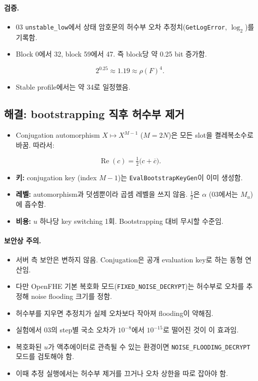 \documentclass[11pt,a4paper]{article}
\renewcommand{\Re}{\operatorname{Re}}
\begin{document}
\paragraph{검증.}
\begin{itemize}
\item 03 \texttt{unstable\_low}에서 상태 암호문의 허수부 오차 추정치(\texttt{GetLogError}, $\log_2$)를 기록함.
\item Block 0에서 32, block 59에서 47. 즉 block당 약 0.25 bit 증가함.
\end{itemize}
\begin{equation}
2^{0.25}\approx1.19\approx\rho(F)^4 .
\end{equation}
\begin{itemize}
\item Stable profile에서는 약 34로 일정했음.
\end{itemize}

\subsection{해결: bootstrapping 직후 허수부 제거}
\begin{itemize}
\item Conjugation automorphism $X\mapsto X^{M-1}$ ($M=2N$)은 모든 slot을 켤레복소수로 바꿈. 따라서:
\end{itemize}
\begin{equation}
\Re(c)=\tfrac12\bigl(c+\overline{c}\bigr).
\end{equation}
\begin{itemize}
\item \textbf{키:} conjugation key (index $M-1$)는 \texttt{EvalBootstrapKeyGen}이 이미 생성함.
\item \textbf{레벨:} automorphism과 덧셈뿐이라 곱셈 레벨을 쓰지 않음. $\tfrac12$은 $\alpha$ (03에서는 $M_u$)에 흡수함.
\item \textbf{비용:} $u$ 하나당 key switching 1회. Bootstrapping 대비 무시할 수준임.
\end{itemize}

\paragraph{보안상 주의.}
\begin{itemize}
\item 서버 측 보안은 변하지 않음. Conjugation은 공개 evaluation key로 하는 동형 연산임.
\item 다만 OpenFHE 기본 복호화 모드(\texttt{FIXED\_NOISE\_DECRYPT})는 허수부로 오차를 추정해 noise flooding 크기를 정함.
\item 허수부를 지우면 추정치가 실제 오차보다 작아져 flooding이 약해짐.
\item 실험에서 03의 step별 국소 오차가 $10^{-8}$에서 $10^{-15}$로 떨어진 것이 이 효과임.
\item 복호화된 $u$가 액추에이터로 관측될 수 있는 환경이면 \texttt{NOISE\_FLOODING\_DECRYPT} 모드를 검토해야 함.
\item 이때 추정 실행에서는 허수부 제거를 끄거나 오차 상한을 따로 잡아야 함.
\end{itemize}
\end{document}
